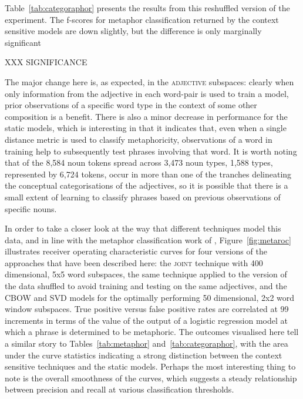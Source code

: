 Table~\ref{tab:categoraphor} presents the results from this reshuffled version of the experiment.  The f-scores for metaphor classification returned by the context sensitive models are down slightly, but the difference is only marginally significant

XXX SIGNIFICANCE

The major change here is, as expected, in the \textsc{adjective} subspaces: clearly when only information from the adjective in each word-pair is used to train a model, prior observations of a specific word type in the context of some other composition is a benefit.  There is also a minor decrease in performance for the static models, which is interesting in that it indicates that, even when a single distance metric is used to classify metaphoricity, observations of a word in training help to subsequently test phrases involving that word.  It is worth noting that of the 8,584 noun tokens spread across 3,473 noun types, 1,588 types, represented by 6,724 tokens, occur in more than one of the tranches delineating the conceptual categorisations of the adjectives, so it is possible that there is a small extent of learning to classify phrases based on previous observations of specific nouns.

In order to take a closer look at the way that different techniques model this data, and in line with the metaphor classification work of \cite{TsvetkovEA2014}, Figure~\ref{fig:metaroc} illustrates receiver operating characteristic curves for four versions of the approaches that have been described here: the \textsc{joint} technique with 400 dimensional, 5x5 word subspaces, the same technique applied to the version of the data shuffled to avoid training and testing on the same adjectives, and the \textsc{CBOW} and \textsc{SVD} models for the optimally performing 50 dimensional, 2x2 word window subspaces.  True positive versus false positive rates are correlated at 99 increments in terms of the value of the output of a logistic regression model at which a phrase is determined to be metaphoric.  The outcomes visualised here tell a similar story to Tables~\ref{tab:metaphor} and~\ref{tab:categoraphor}, with the area under the curve statistics indicating a strong distinction between the context sensitive techniques and the static models.  Perhaps the most interesting thing to note is the overall smoothness of the curves, which suggests a steady relationship between precision and recall at various classification thresholds.

